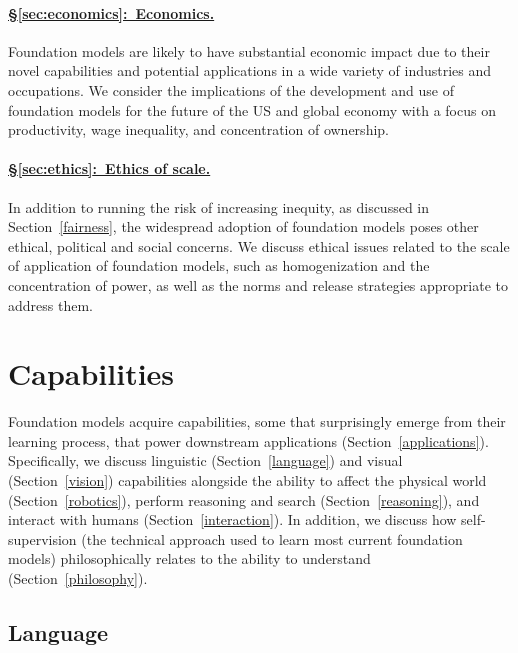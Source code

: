 \paragraph{\hyperref[sec:economics]{§\ref{sec:economics}:~Economics.}}

Foundation models are likely to have substantial economic impact due to their novel capabilities and potential applications in a wide variety of industries and occupations. We consider the implications of the development and use of foundation models for the future of the US and global economy with a focus on productivity, wage inequality, and concentration of ownership.

\paragraph{\hyperref[sec:ethics]{§\ref{sec:ethics}:~Ethics of scale.}}

In addition to running the risk of increasing inequity, as discussed in Section~\ref{fairness}, the widespread adoption of foundation models poses other ethical, political and social concerns.  We discuss ethical issues related to the scale of application of foundation models, such as homogenization and the concentration of power, as well as the norms and release strategies appropriate to address them.

\section{Capabilities}
\label{sec:capabilities}

Foundation models acquire capabilities, some that surprisingly emerge from their learning process, that power downstream applications (Section~\ref{applications}).
Specifically, we discuss linguistic (Section~\ref{language}) and visual (Section~\ref{vision}) capabilities alongside the ability to affect the physical world (Section~\ref{robotics}), perform reasoning and search (Section~\ref{reasoning}), and interact with humans (Section~\ref{interaction}). 
In addition, we discuss how self-supervision (the technical approach used to learn most current foundation models) philosophically relates to the ability to understand (Section~\ref{philosophy}). 

\newsection
\subsection{Language}
\label{sec:language}

